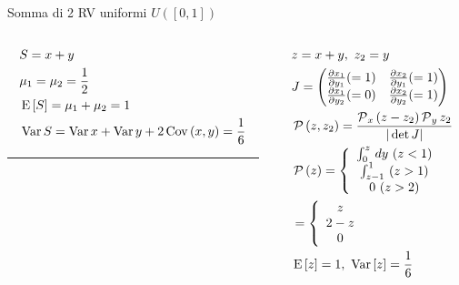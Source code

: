 \documentclass[asd-beamer.tex]{subfiles}%
\begin{document}
\begin{wordonframe}{Somma di 2 RV uniformi $U([0,1])$}
	\begin{columns}[T]
		\begin{column}{0.5\textwidth}
			\begin{align*}
			&S=x+y\\
			&\mu_1=\mu_2=\frac{1}{2}\\
			&\E{[S]}=\mu_1+\mu_2=1\\
			&\var{S}=\var{x}+\var{y}+2\cov{(x,y)}=\frac{1}{6}
			\end{align*}
			\noindent\rule{0.9\textwidth}{0.4pt}
		\end{column}
		\begin{column}{0.5\textwidth}
			\begin{align*}
			&z=x+y,\ z_2=y\\
			&J=\begin{pmatrix}
			\PDy{y_1}{x_1}(=1)&\PDy{y_1}{x_2}(=1)\\
			\PDy{y_2}{x_1}(=0)&\PDy{y_2}{x_2}(=1)\\
			\end{pmatrix}\\
			&\prob{(z,z_2)}=\frac{\prob_x{(z-z_2)}\prob_y{z_2}}{|\det{J}|}\\
			&\prob{(z)}=\left\{\begin{array}{c}
			\int_0^z\,dy\ (z<1)\\
			\int_{z-1}^1\ (z>1)\\
			0\ (z>2)\\
			\end{array}\right.\\
			&=\left\{\begin{array}{c}
			z\\
			2-z\\
			0\\
			\end{array}\right.\\
			&\E{[z]}=1,\ \var{[z]}=\frac{1}{6}
			\end{align*}
		\end{column}
	\end{columns}
\end{wordonframe}
\end{document}
